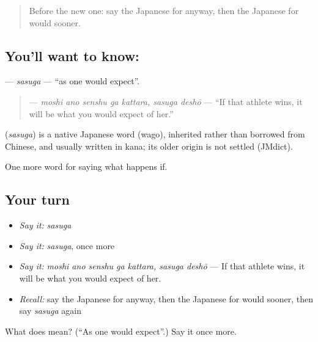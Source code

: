\label{lesson:JA-C529-sasuga}



\begin{quote}
Before the new one: say the Japanese for anyway, then the Japanese for would sooner.
\end{quote}

\subsection*{You'll want to know: }
\textbf{} — \emph{sasuga} — \textquotedblleft{}as one would expect\textquotedblright{}.

\begin{quote}
\textbf{   } — \emph{moshi ano senshu ga kattara, sasuga deshō} — \textquotedblleft{}If that athlete wins, it will be what you would expect of her.\textquotedblright{}
\end{quote}

\begin{cousinweb}
\textbf{} (\emph{sasuga}) is a native Japanese word (wago), inherited rather than borrowed from Chinese, and usually written in kana; its older origin is not settled (JMdict).
\end{cousinweb}

\begin{grammarlens}[title={What you've built}]
One more word for saying what happens if.
\end{grammarlens}

\subsection*{Your turn}
\begin{itemize}
\raggedright
  \item \emph{Say it:} \emph{sasuga}
  \item \emph{Say it:} \emph{sasuga}, once more
  \item \emph{Say it:} \emph{moshi ano senshu ga kattara, sasuga deshō} — If that athlete wins, it will be what you would expect of her.
  \item \emph{Recall:} say the Japanese for anyway, then the Japanese for would sooner, then say \emph{sasuga} again
\end{itemize}

\begin{tcolorbox}[breakable,colback=teal!4,colframe=teal!35!black,title={Before you move on}]
What does  mean? (\textquotedblleft{}As one would expect\textquotedblright{}.) Say it once more.
\end{tcolorbox}
